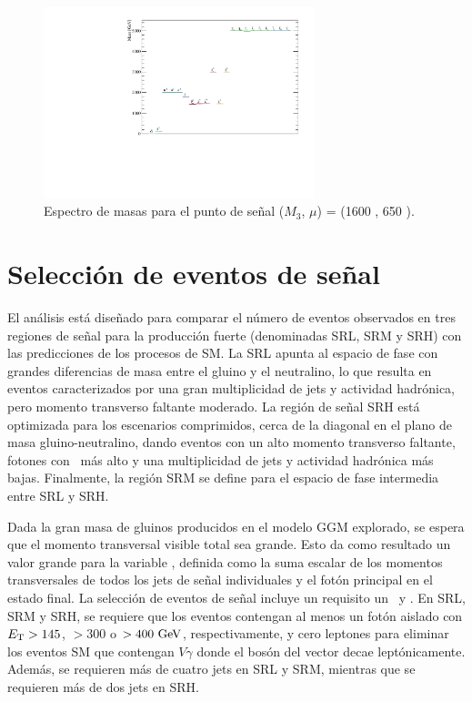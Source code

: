 \begin{figure}
  \centering
  \includegraphics[width=0.7\textwidth]{images/phb_mass_spectrum.pdf}
  \caption{Espectro de masas para el punto de señal ($M_3$, $\mu$) = (1600 {\gev}, 650 \gev).}
  \label{fig:mass_spectra}
\end{figure}

\section{Selección de eventos de señal}

El análisis está diseñado para comparar el número de eventos observados en tres regiones de señal para la producción fuerte (denominadas SRL, SRM y SRH) con las predicciones de los procesos de SM.
La SRL apunta al espacio de fase con grandes diferencias de masa entre el gluino y el neutralino, lo que resulta en eventos caracterizados por una gran multiplicidad de jets y actividad hadrónica, pero momento transverso faltante moderado. La región de señal SRH está optimizada para los escenarios comprimidos, cerca de la diagonal en el plano de masa gluino-neutralino, dando eventos con un alto momento transverso faltante, fotones con \pt\ más alto y una multiplicidad de jets y actividad hadrónica más bajas. Finalmente, la región SRM se define para el espacio de fase intermedia entre SRL y SRH.

Dada la gran masa de gluinos producidos en el modelo GGM explorado, se espera que el momento transversal visible total sea grande. Esto da como resultado un valor grande para la variable \HT, definida como la suma escalar de los momentos transversales de todos los jets de señal individuales y el fotón principal en el estado final.
La selección de eventos de señal incluye un requisito un \HT \ y \met.
En SRL, SRM y SRH, se requiere que los eventos contengan al menos un fotón aislado con $E_{\text{T}}> 145$, $>300 $ o $>400\ \text{GeV}$, respectivamente, y cero leptones para eliminar los eventos SM que contengan $ V\gamma$ donde el bosón del vector decae leptónicamente. Además, se requieren más de cuatro jets en SRL y SRM, mientras que se requieren más de dos jets en SRH.

